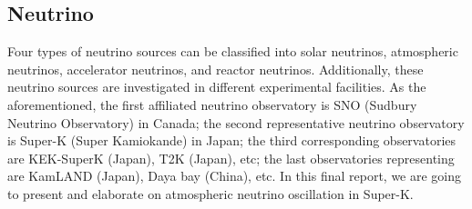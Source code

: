 \documentclass[12pt]{article}
\begin{document}
\setlength{\columnsep}{0.03\textwidth}
\begin{multicols}{2}
\thispagestyle{fancy}

\section{Neutrino}
    Four types of neutrino sources can be classified into solar neutrinos, atmospheric neutrinos, accelerator neutrinos, and reactor neutrinos. Additionally, these neutrino sources are investigated in different experimental facilities. As the aforementioned, the first affiliated neutrino observatory is SNO (Sudbury Neutrino Observatory) in Canada; the second representative neutrino observatory is Super-K (Super Kamiokande) in Japan; the third corresponding observatories are KEK-SuperK (Japan), T2K (Japan), etc; the last observatories representing are KamLAND (Japan), Daya bay (China), etc. In this final report, we are going to present and elaborate on atmospheric neutrino oscillation in Super-K.


\end{multicols}
\end{document}
